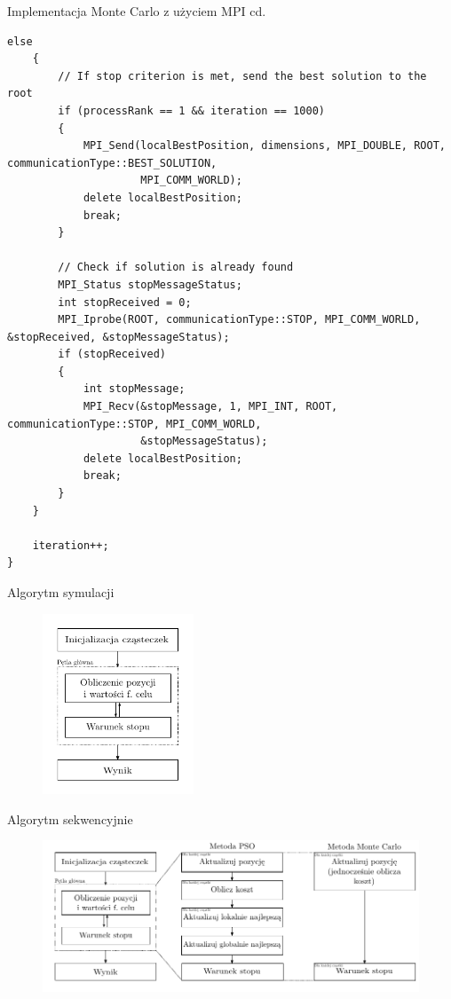 \documentclass[handout]{beamer}
\begin{document}
\begin{frame}[fragile]{Implementacja Monte Carlo z użyciem MPI cd.}

\vspace{-.8cm}

\begin{lstlisting}[style=mycpp, label=code:pso_before, caption={MPI -- Monte Carlo cd.}]
    else
    {
        // If stop criterion is met, send the best solution to the root
        if (processRank == 1 && iteration == 1000)
        {
            MPI_Send(localBestPosition, dimensions, MPI_DOUBLE, ROOT, communicationType::BEST_SOLUTION,
                     MPI_COMM_WORLD);
            delete localBestPosition;
            break;
        }

        // Check if solution is already found
        MPI_Status stopMessageStatus;
        int stopReceived = 0;
        MPI_Iprobe(ROOT, communicationType::STOP, MPI_COMM_WORLD, &stopReceived, &stopMessageStatus);
        if (stopReceived)
        {
            int stopMessage;
            MPI_Recv(&stopMessage, 1, MPI_INT, ROOT, communicationType::STOP, MPI_COMM_WORLD,
                     &stopMessageStatus);
            delete localBestPosition;
            break;
        }
    }

    iteration++;
}
\end{lstlisting}
\end{frame}

\begin{frame}{Algorytm symulacji}
\begin{figure}[t]
\includegraphics[width=0.4\textwidth]{grafiki/alg_ogolny.pdf}
\end{figure}
\end{frame}

\begin{frame}{Algorytm sekwencyjnie}
\begin{figure}[t]
\includegraphics[width=1\textwidth]{grafiki/alg_szczegolowy.pdf}
\end{figure}
\end{frame}
\end{document}
